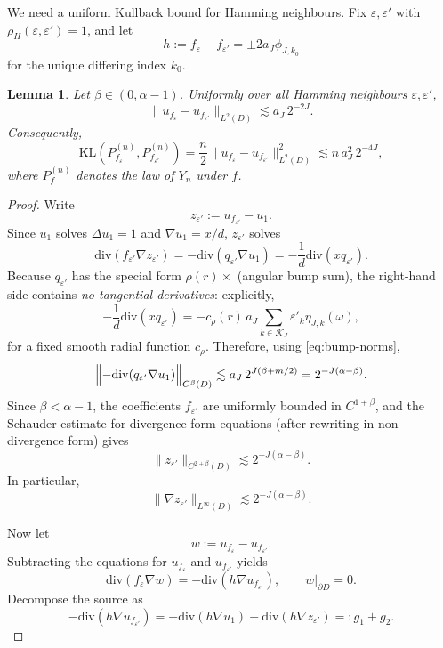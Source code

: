 \documentclass[11pt]{article}
\newtheorem{lemma}[theorem]{Lemma}
\newcommand{\KL}{\mathrm{KL}}
\newcommand{\diver}{\mathrm{div}}
\begin{document}
We need a uniform Kullback bound for Hamming neighbours. Fix $\varepsilon,\varepsilon'$ with $\rho_H(\varepsilon,\varepsilon')=1$, and let
\[
h:=f_\varepsilon-f_{\varepsilon'}=\pm 2a_J \phi_{J,k_0}
\]
for the unique differing index $k_0$.

\begin{lemma}\label{lem:neighbor-bound}
Let $\beta\in (0,\alpha-1)$. Uniformly over all Hamming neighbours $\varepsilon,\varepsilon'$,
\[
\|u_{f_\varepsilon}-u_{f_{\varepsilon'}}\|_{L^2(D)}
\lesssim
a_J\, 2^{-2J}.
\]
Consequently,
\[
\KL(P_{f_\varepsilon}^{(n)},P_{f_{\varepsilon'}}^{(n)})
=
\frac n2 \|u_{f_\varepsilon}-u_{f_{\varepsilon'}}\|_{L^2(D)}^2
\lesssim
n\, a_J^2\, 2^{-4J},
\]
where $P_f^{(n)}$ denotes the law of $Y_n$ under $f$.
\end{lemma}

\begin{proof}
Write
\[
z_{\varepsilon'}:=u_{f_{\varepsilon'}}-u_1.
\]
Since $u_1$ solves $\Delta u_1=1$ and $\nabla u_1=x/d$, $z_{\varepsilon'}$ solves
\[
\diver(f_{\varepsilon'}\nabla z_{\varepsilon'})=-\diver(q_{\varepsilon'}\nabla u_1)
= -\frac1d \diver(x q_{\varepsilon'}).
\]
Because $q_{\varepsilon'}$ has the special form $\rho(r)\times$ (angular bump sum), the right-hand side contains \emph{no tangential derivatives}: explicitly,
\[
-\frac1d\diver(x q_{\varepsilon'})
=
-c_\rho(r)\, a_J \sum_{k\in \mathcal K_J} \varepsilon'_k \eta_{J,k}(\omega),
\]
for a fixed smooth radial function $c_\rho$. Therefore, using \eqref{eq:bump-norms},
\[
\Bigl\|-\diver(q_{\varepsilon'}\nabla u_1)\Bigr\|_{C^\beta(D)}
\lesssim
a_J\, 2^{J(\beta+m/2)}
=
2^{-J(\alpha-\beta)}.
\]
Since $\beta<\alpha-1$, the coefficients $f_{\varepsilon'}$ are uniformly bounded in $C^{1+\beta}$, and the Schauder estimate for divergence-form equations (after rewriting in non-divergence form) gives
\begin{equation}\label{eq:z-small}
\|z_{\varepsilon'}\|_{C^{2+\beta}(D)}
\lesssim
2^{-J(\alpha-\beta)}.
\end{equation}
In particular,
\[
\|\nabla z_{\varepsilon'}\|_{L^\infty(D)}
\lesssim
2^{-J(\alpha-\beta)}.
\]

Now let
\[
w:=u_{f_\varepsilon}-u_{f_{\varepsilon'}}.
\]
Subtracting the equations for $u_{f_\varepsilon}$ and $u_{f_{\varepsilon'}}$ yields
\[
\diver(f_\varepsilon\nabla w)=-\diver(h\nabla u_{f_{\varepsilon'}}),\qquad w|_{\partial D}=0.
\]
Decompose the source as
\[
-\diver(h\nabla u_{f_{\varepsilon'}})
=
-\diver(h\nabla u_1)-\diver(h\nabla z_{\varepsilon'})
=:g_1+g_2.
\]


\end{proof}
\end{document}
